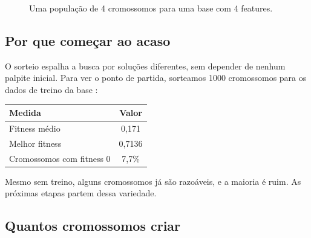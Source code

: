 \documentclass[11pt,a4paper]{article}
\newcommand{\code}[1]{\texttt{\detokenize{#1}}}
\newenvironment{tabela}{\par\nopagebreak[4]\vspace{0.3em}\nopagebreak[4]\begingroup\centering\small}{\par\endgroup\vspace{0.6em}}
\newcommand{\celula}[4]{%
  \node[draw=white,line width=1.2pt,fill=#4,minimum width=1.15cm,minimum height=0.62cm,
    inner sep=0pt,font=\small,text=tinta] at (#1,#2) {#3};}
\begin{document}
\begin{figure}[H]
\centering
{}
\caption{Uma população de 4 cromossomos para uma base com 4 features.}
\label{fig:populacao}
\end{figure}

\subsection{Por que começar ao acaso}

O sorteio espalha a busca por soluções diferentes, sem depender de nenhum palpite inicial. Para ver o ponto de partida, sorteamos 1000 cromossomos para os dados de treino da base \code{dados_binario_1.xlsx}:

\begin{tabela}
\begin{tabular}{lc}
\toprule
Medida & Valor\\
\midrule
Fitness médio & 0,171\\
Melhor fitness & 0,7136\\
Cromossomos com fitness 0 & 7,7\%\\
\bottomrule
\end{tabular}
\end{tabela}

Mesmo sem treino, alguns cromossomos já são razoáveis, e a maioria é ruim. As próximas etapas partem dessa variedade.

\subsection{Quantos cromossomos criar}
\end{document}
